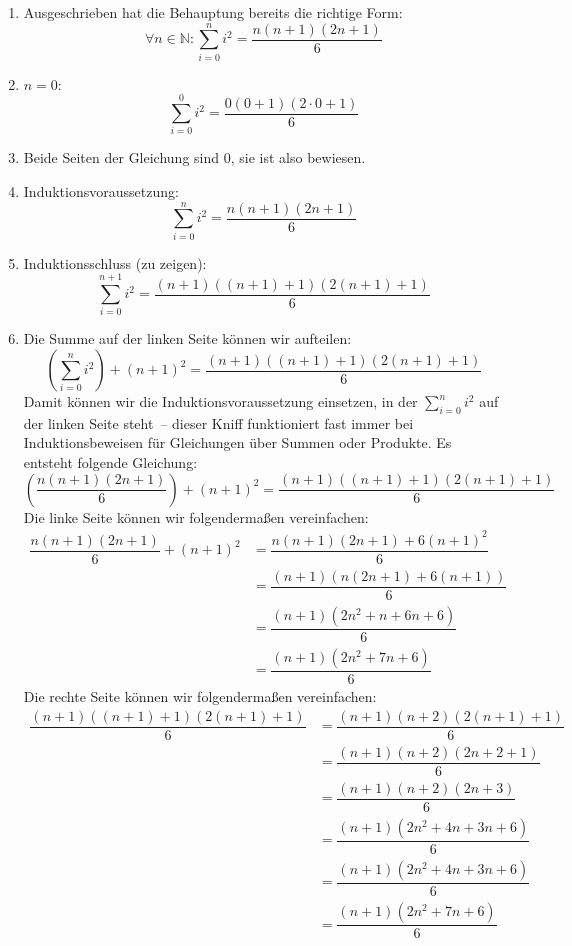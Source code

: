 \begin{enumerate}
\item Ausgeschrieben hat die Behauptung bereits die richtige Form:
\begin{displaymath}
  \forall n\in\mathbb{N}: \sum_{i=0}^n i^2 = \dfrac{n(n+1)(2n+1)}{6}
\end{displaymath}
\item $n=0$:
\begin{displaymath}
  \sum_{i=0}^0 i^2 = \dfrac{0(0+1)(2\cdot 0+1)}{6}
\end{displaymath}
\item Beide Seiten der Gleichung sind $0$, sie ist also bewiesen.
\item Induktionsvoraussetzung:
%
\begin{displaymath}
  \sum_{i=0}^n i^2 = \dfrac{n(n+1)(2n+1)}{6}
\end{displaymath}
\item Induktionsschluss (zu zeigen):
\begin{displaymath}
  \sum_{i=0}^{n+1} i^2 = \dfrac{(n+1)((n+1)+1)(2(n+1)+1)}{6}
\end{displaymath}
\item Die Summe auf der linken Seite können wir aufteilen:
%
\begin{displaymath}
  (\sum_{i=0}^{n} i^2) + (n+1)^2  = \dfrac{(n+1)((n+1)+1)(2(n+1)+1)}{6}
\end{displaymath}
%
Damit können wir die Induktionsvoraussetzung einsetzen, in der
$\sum_{i=0}^{n} i^2$ auf der linken Seite steht~-- dieser Kniff
funktioniert fast immer bei Induktionsbeweisen für Gleichungen über
Summen oder Produkte.  Es entsteht folgende Gleichung:
%
\begin{displaymath}
  (\dfrac{n(n+1)(2n+1)}{6}) + (n+1)^2  =
  \dfrac{(n+1)((n+1)+1)(2(n+1)+1)}{6}
\end{displaymath}
%
Die linke Seite können wir folgendermaßen vereinfachen:
%
\begin{displaymath}
\begin{split}
  \dfrac{n(n+1)(2n+1)}{6} + (n+1)^2  &=
  \dfrac{n(n+1)(2n+1) + 6(n+1)^2}{6} \\ &=
  \dfrac{(n+1)(n(2n+1) + 6(n+1))}{6} \\ &=
  \dfrac{(n+1)(2n^2+n + 6n+6)}{6} \\ &=
  \dfrac{(n+1)(2n^2+  7n+6)}{6}
\end{split}
\end{displaymath}
%
Die rechte Seite können wir folgendermaßen vereinfachen:
%
\begin{displaymath}
  \begin{split}
  \dfrac{(n+1)((n+1)+1)(2(n+1)+1)}{6} &=
  \dfrac{(n+1)(n+2)(2(n+1)+1)}{6} \\ &=
  \dfrac{(n+1)(n+2)(2n+2+1)}{6} \\ &=
  \dfrac{(n+1)(n+2)(2n+3)}{6} \\ &=
  \dfrac{(n+1)(2n^2 + 4n + 3n + 6)}{6} \\ &=
  \dfrac{(n+1)(2n^2 + 4n + 3n + 6)}{6} \\ &=
  \dfrac{(n+1)(2n^2 + 7n + 6)}{6}
\end{split}
\end{displaymath}
\end{enumerate}
